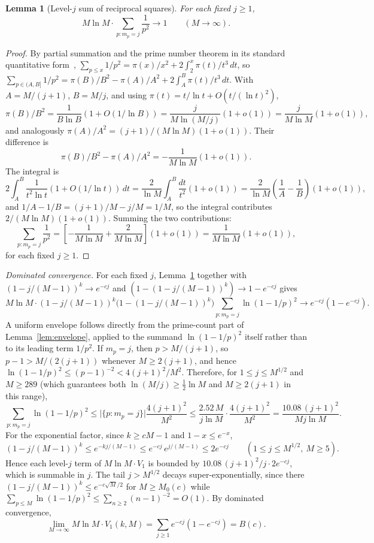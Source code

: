 \documentclass[11pt]{article}
\newtheorem{lemma}[theorem]{Lemma}
\theoremstyle{remark}
\begin{document}
\begin{lemma}[Level-$j$ sum of reciprocal squares]\label{lem:1-over-p-squared}
For each fixed $j \geq 1$,
\[
M \ln M \cdot \sum_{p \colon m_p = j} \frac{1}{p^2} \longrightarrow 1 \qquad (M \to \infty).
\]
\end{lemma}
\begin{proof}
By partial summation and the prime number theorem in its standard quantitative form~\cite{Tenenbaum2015}, $\sum_{p \leq x} 1/p^2 = \pi(x)/x^2 + 2 \int_2^x \pi(t)/t^3\, dt$, so $\sum_{p \in (A, B]} 1/p^2 = \pi(B)/B^2 - \pi(A)/A^2 + 2\int_A^B \pi(t)/t^3\, dt$. With $A = M/(j+1)$, $B = M/j$, and using $\pi(t) = t/\ln t + O(t/(\ln t)^2)$,
\[
\pi(B)/B^2 = \frac{1}{B \ln B}(1 + O(1/\ln B)) = \frac{j}{M \ln(M/j)}(1 + o(1)) = \frac{j}{M \ln M}(1 + o(1)),
\]
and analogously $\pi(A)/A^2 = (j+1)/(M \ln M)(1+o(1))$. Their difference is
\[
\pi(B)/B^2 - \pi(A)/A^2 = -\frac{1}{M \ln M}(1+o(1)).
\]
The integral is
\[
2\int_A^B \frac{1}{t^2 \ln t}(1 + O(1/\ln t))\, dt = \frac{2}{\ln M}\int_A^B \frac{dt}{t^2}(1 + o(1)) = \frac{2}{\ln M}\!\left(\frac{1}{A} - \frac{1}{B}\right)(1 + o(1)),
\]
and $1/A - 1/B = (j+1)/M - j/M = 1/M$, so the integral contributes $2/(M\ln M)(1+o(1))$. Summing the two contributions:
\[
\sum_{p \colon m_p = j} \frac{1}{p^2} = \left[-\frac{1}{M \ln M} + \frac{2}{M \ln M}\right](1+o(1)) = \frac{1}{M \ln M}(1 + o(1)),
\]
for each fixed $j \geq 1$.
\end{proof}

\emph{Dominated convergence.} For each fixed $j$, Lemma~\ref{lem:1-over-p-squared} together with $(1 - j/(M-1))^k \to e^{-cj}$ and $(1 - (1 - j/(M-1))^k) \to 1 - e^{-cj}$ gives
\[
M \ln M \cdot (1 - j/(M-1))^k\bigl(1 - (1 - j/(M-1))^k\bigr) \sum_{p \colon m_p = j} \ln(1-1/p)^2 \longrightarrow e^{-cj}(1 - e^{-cj}).
\]
A uniform envelope follows directly from the prime-count part of Lemma~\ref{lem:envelope}, applied to the summand $\ln(1-1/p)^2$ itself rather than to its leading term $1/p^2$. If $m_p=j$, then $p>M/(j+1)$, so $p-1 > M/(2(j+1))$ whenever $M \geq 2(j+1)$, and hence $\ln(1-1/p)^2 \leq (p-1)^{-2} < 4(j+1)^2/M^2$. Therefore, for $1 \leq j \leq M^{1/2}$ and $M \geq 289$ (which guarantees both $\ln(M/j) \geq \tfrac12 \ln M$ and $M \geq 2(j+1)$ in this range),
\[
\sum_{p \colon m_p = j} \ln(1-1/p)^2
\leq \bigl|\{p:m_p=j\}\bigr|\frac{4(j+1)^2}{M^2}
\leq \frac{2.52\,M}{j\ln M}\cdot\frac{4(j+1)^2}{M^2}
=\frac{10.08\,(j+1)^2}{Mj\ln M}.
\]
For the exponential factor, since $k \geq cM - 1$ and $1 - x \leq e^{-x}$,
\[
(1 - j/(M-1))^k \leq e^{-kj/(M-1)} \leq e^{-cj}\, e^{j/(M-1)} \leq 2 e^{-cj}
\qquad (1 \leq j \leq M^{1/2},\ M \geq 5).
\]
Hence each level-$j$ term of $M \ln M \cdot V_1$ is bounded by $10.08\,(j+1)^2/j \cdot 2 e^{-cj}$, which is summable in $j$. The tail $j > M^{1/2}$ decays super-exponentially, since there $(1 - j/(M-1))^k \leq e^{-c\sqrt{M}/2}$ for $M \geq M_0(c)$ while $\sum_{p \leq M} \ln(1-1/p)^2 \leq \sum_{n \geq 2}(n-1)^{-2} = O(1)$. By dominated convergence,
\begin{equation}\label{eq:V1-limit}
\lim_{M \to \infty} M \ln M \cdot V_1(k, M) = \sum_{j \geq 1} e^{-cj}(1 - e^{-cj}) = B(c).
\end{equation}
\end{document}
